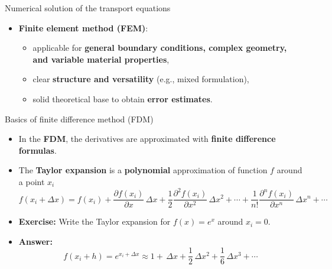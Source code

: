 \begin{frame}{Numerical solution of the transport equations}
\begin{itemize}
%
\item \alert{\bf Finite element method (FEM)}:
\begin{itemize}
	\item applicable for {\bf general boundary conditions, complex geometry, and  variable material properties},
	\item clear {\bf structure and versatility} (e.g., mixed formulation), 
	\item solid theoretical base to obtain {\bf error estimates}.
\end{itemize}
%

\end{itemize}
\end{frame}
%
%
\begin{frame}{Basics of finite difference method (FDM)}
\begin{itemize}
\item In the \alert{\bf FDM}, the derivatives are approximated
with {\bf finite difference formulas}.
\item The \alert{\bf Taylor expansion} is a \textbf{polynomial} approximation of function $f$ around
a point $x_{i}$
\[
f(x_{i}+\Delta x)=f(x_{i})+\frac{\partial f(x_{i})}{\partial x}\,\Delta x+\frac{1}{2}\frac{\partial^{2}f(x_{i})}{\partial x^{2}}\,\Delta x^{2}+\cdots+\frac{1}{n!}\frac{\partial^{n}f(x_{i})}{\partial x^{n}}\,\Delta x^{n}+\cdots
\]
\item \textbf{Exercise:} Write the Taylor expansion for $f(x)=e^{x}$ around
$x_{i}=0$. 
\hiddenpause
\item \textbf{Answer:}
\[
f(x_{i}+h)=e^{x_{i}+\Delta x} \approx 1+\, \Delta x+\frac{1}{2}\, \Delta x^{2}+\frac{1}{6}\, \Delta x^{3}+\cdots
\]
\end{itemize}
\end{frame}
